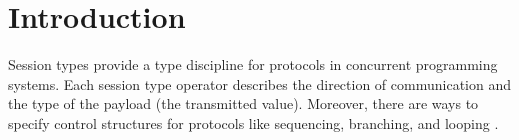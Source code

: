 \documentclass[acmsmall,review,anonymous,screen]{acmart}
\begin{document}




\maketitle

\section{Introduction}
\label{sec:introduction}



Session types provide a type discipline for protocols
in concurrent programming systems. Each session type operator
describes the direction of communication and the type of the
payload (the transmitted value). Moreover, there are ways to specify
control structures for protocols like sequencing, branching, and
looping \cite{DBLP:conf/concur/Honda93,DBLP:conf/parle/TakeuchiHK94,DBLP:conf/esop/HondaVK98}.
\end{document}
